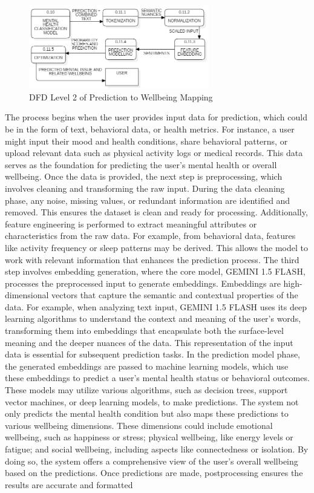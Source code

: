 \begin{figure}[h!]  
    \centering
    \includegraphics[width=0.7\textwidth]{Images/DFD L2 MW.png}  
    \caption{DFD Level 2 of Prediction to Wellbeing Mapping}
    \label{dfdl166}  %
\end{figure}

\noindent
The process begins when the user provides input data for prediction, which could be in the form of text, behavioral data, or health metrics. For instance, a user might input their mood and health conditions, share behavioral patterns, or upload relevant data such as physical activity logs or medical records. This data serves as the foundation for predicting the user's mental health or overall wellbeing. Once the data is provided, the next step is preprocessing, which involves cleaning and transforming the raw input. During the data cleaning phase, any noise, missing values, or redundant information are identified and removed. This ensures the dataset is clean and ready for processing. Additionally, feature engineering is performed to extract meaningful attributes or characteristics from the raw data. For example, from behavioral data, features like activity frequency or sleep patterns may be derived. This allows the model to work with relevant information that enhances the prediction process. The third step involves embedding generation, where the core model, GEMINI 1.5 FLASH, processes the preprocessed input to generate embeddings. Embeddings are high-dimensional vectors that capture the semantic and contextual properties of the data. For example, when analyzing text input, GEMINI 1.5 FLASH uses its deep learning algorithms to understand the context and meaning of the user's words, transforming them into embeddings that encapsulate both the surface-level meaning and the deeper nuances of the data. This representation of the input data is essential for subsequent prediction tasks. In the prediction model phase, the generated embeddings are passed to machine learning models, which use these embeddings to predict a user's mental health status or behavioral outcomes. These models may utilize various algorithms, such as decision trees, support vector machines, or deep learning models, to make predictions. The system not only predicts the mental health condition but also maps these predictions to various wellbeing dimensions. These dimensions could include emotional wellbeing, such as happiness or stress; physical wellbeing, like energy levels or fatigue; and social wellbeing, including aspects like connectedness or isolation. By doing so, the system offers a comprehensive view of the user's overall wellbeing based on the predictions. Once predictions are made, postprocessing ensures the results are accurate and formatted 